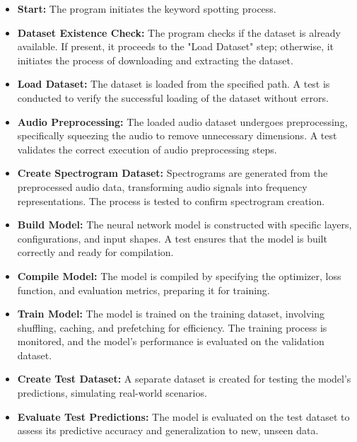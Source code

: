 \begin{itemize}
	\item \textbf{Start:} The program initiates the keyword spotting process.
	
	\item \textbf{Dataset Existence Check:} The program checks if the dataset is already available. If present, it proceeds to the "Load Dataset" step; otherwise, it initiates the process of downloading and extracting the dataset.
	
	\item \textbf{Load Dataset:} The dataset is loaded from the specified path. A test is conducted to verify the successful loading of the dataset without errors.
	
	\item \textbf{Audio Preprocessing:} The loaded audio dataset undergoes preprocessing, specifically squeezing the audio to remove unnecessary dimensions. A test validates the correct execution of audio preprocessing steps.
	
	\item \textbf{Create Spectrogram Dataset:} Spectrograms are generated from the preprocessed audio data, transforming audio signals into frequency representations. The process is tested to confirm spectrogram creation.
	
	\item \textbf{Build Model:} The neural network model is constructed with specific layers, configurations, and input shapes. A test ensures that the model is built correctly and ready for compilation.
	
	\item \textbf{Compile Model:} The model is compiled by specifying the optimizer, loss function, and evaluation metrics, preparing it for training.
	
	\item \textbf{Train Model:} The model is trained on the training dataset, involving shuffling, caching, and prefetching for efficiency. The training process is monitored, and the model's performance is evaluated on the validation dataset.
	
	\item \textbf{Create Test Dataset:} A separate dataset is created for testing the model's predictions, simulating real-world scenarios.
	
	\item \textbf{Evaluate Test Predictions:} The model is evaluated on the test dataset to assess its predictive accuracy and generalization to new, unseen data.
	

\end{itemize}
